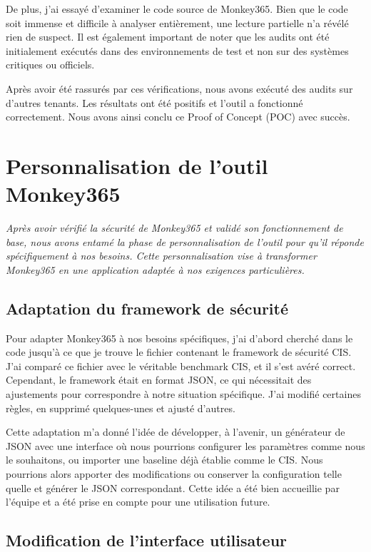 De plus, j'ai essayé d'examiner le code source de Monkey365. Bien que le code soit immense et difficile à analyser entièrement, une lecture partielle n'a révélé rien de suspect. Il est également important de noter que les audits ont été initialement exécutés dans des environnements de test et non sur des systèmes critiques ou officiels.

Après avoir été rassurés par ces vérifications, nous avons exécuté des audits sur d'autres tenants. Les résultats ont été positifs et l'outil a fonctionné correctement. Nous avons ainsi conclu ce Proof of Concept (POC) avec succès.

    

\section{Personnalisation de l'outil Monkey365}

\textit{Après avoir vérifié la sécurité de Monkey365 et validé son fonctionnement de base, nous avons entamé la phase de personnalisation de l'outil pour qu'il réponde spécifiquement à nos besoins. Cette personnalisation vise à transformer Monkey365 en une application adaptée à nos exigences particulières.}

\subsection{Adaptation du framework de sécurité}

Pour adapter Monkey365 à nos besoins spécifiques, j'ai d'abord cherché dans le code jusqu'à ce que je trouve le fichier contenant le framework de sécurité CIS. J'ai comparé ce fichier avec le véritable benchmark CIS, et il s'est avéré correct. Cependant, le framework était en format JSON, ce qui nécessitait des ajustements pour correspondre à notre situation spécifique. J'ai modifié certaines règles, en supprimé quelques-unes et ajusté d'autres.

Cette adaptation m'a donné l'idée de développer, à l'avenir, un générateur de JSON avec une interface où nous pourrions configurer les paramètres comme nous le souhaitons, ou importer une baseline déjà établie comme le CIS. Nous pourrions alors apporter des modifications ou conserver la configuration telle quelle et générer le JSON correspondant. Cette idée a été bien accueillie par l'équipe et a été prise en compte pour une utilisation future.

\subsection{Modification de l'interface utilisateur}

